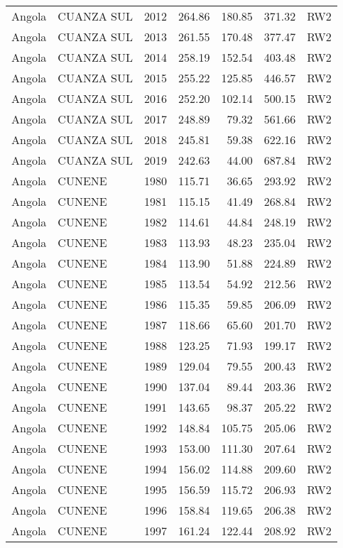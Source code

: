 \begin{longtable}{lllrrrl}
  Angola & CUANZA SUL & 2012 & 264.86 & 180.85 & 371.32 & RW2 \\ 
  Angola & CUANZA SUL & 2013 & 261.55 & 170.48 & 377.47 & RW2 \\ 
  Angola & CUANZA SUL & 2014 & 258.19 & 152.54 & 403.48 & RW2 \\ 
  Angola & CUANZA SUL & 2015 & 255.22 & 125.85 & 446.57 & RW2 \\ 
  Angola & CUANZA SUL & 2016 & 252.20 & 102.14 & 500.15 & RW2 \\ 
  Angola & CUANZA SUL & 2017 & 248.89 & 79.32 & 561.66 & RW2 \\ 
  Angola & CUANZA SUL & 2018 & 245.81 & 59.38 & 622.16 & RW2 \\ 
  Angola & CUANZA SUL & 2019 & 242.63 & 44.00 & 687.84 & RW2 \\ 
  Angola & CUNENE & 1980 & 115.71 & 36.65 & 293.92 & RW2 \\ 
  Angola & CUNENE & 1981 & 115.15 & 41.49 & 268.84 & RW2 \\ 
  Angola & CUNENE & 1982 & 114.61 & 44.84 & 248.19 & RW2 \\ 
  Angola & CUNENE & 1983 & 113.93 & 48.23 & 235.04 & RW2 \\ 
  Angola & CUNENE & 1984 & 113.90 & 51.88 & 224.89 & RW2 \\ 
  Angola & CUNENE & 1985 & 113.54 & 54.92 & 212.56 & RW2 \\ 
  Angola & CUNENE & 1986 & 115.35 & 59.85 & 206.09 & RW2 \\ 
  Angola & CUNENE & 1987 & 118.66 & 65.60 & 201.70 & RW2 \\ 
  Angola & CUNENE & 1988 & 123.25 & 71.93 & 199.17 & RW2 \\ 
  Angola & CUNENE & 1989 & 129.04 & 79.55 & 200.43 & RW2 \\ 
  Angola & CUNENE & 1990 & 137.04 & 89.44 & 203.36 & RW2 \\ 
  Angola & CUNENE & 1991 & 143.65 & 98.37 & 205.22 & RW2 \\ 
  Angola & CUNENE & 1992 & 148.84 & 105.75 & 205.06 & RW2 \\ 
  Angola & CUNENE & 1993 & 153.00 & 111.30 & 207.64 & RW2 \\ 
  Angola & CUNENE & 1994 & 156.02 & 114.88 & 209.60 & RW2 \\ 
  Angola & CUNENE & 1995 & 156.59 & 115.72 & 206.93 & RW2 \\ 
  Angola & CUNENE & 1996 & 158.84 & 119.65 & 206.38 & RW2 \\ 
  Angola & CUNENE & 1997 & 161.24 & 122.44 & 208.92 & RW2 \\ 

\end{longtable}

